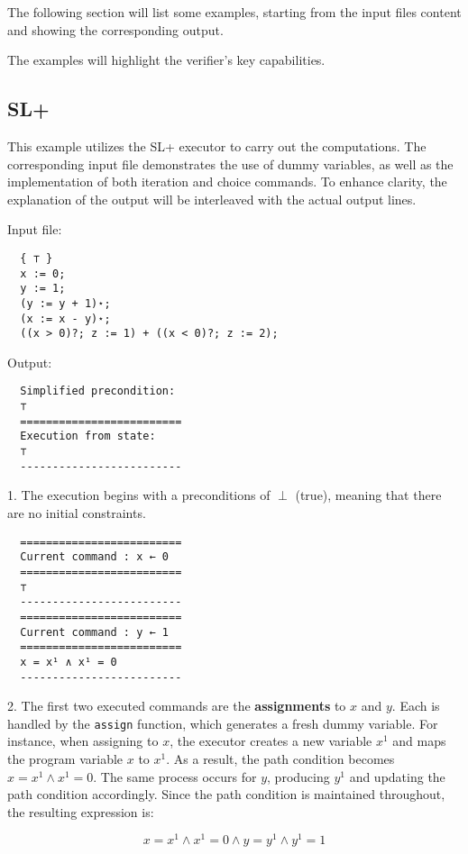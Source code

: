 \documentclass[parskip=half]{scrartcl}
\begin{document}
The following section will list some examples, starting from the input files content and showing the corresponding output.

The examples will highlight the verifier's key capabilities.  

\subsection{SL+}
This example utilizes the SL+ executor to carry out the computations. The corresponding input file demonstrates the use of dummy variables, as well as the implementation of both iteration and choice commands. To enhance clarity, the explanation of the output will be interleaved with the actual output lines.

Input file: 
\begin{verbatim} 
  { ⊤ }
  x := 0;
  y := 1;
  (y := y + 1)⋆;
  (x := x - y)⋆;
  ((x > 0)?; z := 1) + ((x < 0)?; z := 2);
\end{verbatim}

Output: 
\begin{verbatim} 
  Simplified precondition:              
  ⊤
  =========================
  Execution from state:
  ⊤
  -------------------------
\end{verbatim}
1. The execution begins with a preconditions of $\perp$ (true), meaning that there are no initial constraints.

\begin{verbatim}
  =========================
  Current command : x ← 0
  =========================
  ⊤
  -------------------------
  =========================
  Current command : y ← 1
  =========================
  x = x¹ ∧ x¹ = 0
  -------------------------
\end{verbatim}
2. The first two executed commands are the \textbf{assignments} to $x$ and $y$. Each is handled by the \texttt{assign} function, which generates a fresh dummy variable. For instance, when assigning to $x$, the executor creates a new variable $x^1$ and maps the program variable $x$ to $x^1$. As a result, the path condition becomes $x = x^1 \land x^1 = 0$. The same process occurs for $y$, producing $y^1$ and updating the path condition accordingly. Since the path condition is maintained throughout, the resulting expression is:

$$
x = x^1 \land x^1 = 0 \land y = y^1 \land y^1 = 1
$$
\end{document}
